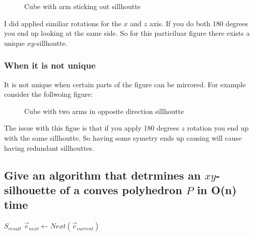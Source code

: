 \documentclass{article}
\begin{document}
\begin{empfile}
\begin{figure}
\caption{Cube with arm sticking out sillhoutte}
\end{figure}

I did applied similiar rotations for the $x$ and $z$ axis. If you
do both 180 degrees you end up looking at the same side. So for this
particiluar figure there exists a unique $xy$-sillhoutte.

\subsubsection{When it is not unique}

It is not unique when certain parts of the figure can be mirrored. For
example consider the follwoing figure:

\begin{figure}
\caption{Cube with two arms in opposite direction sillhoutte}
\end{figure}

The issue with this figue is that if you apply 180 degrees $z$ rotation you
end up with the same sillhoutte. So having some symetry ends up causing will
cause having redundant sillhouttes.

\subsection{Give an algorithm that detrmines an $xy$-silhouette of a conves polyhedron $P$ in O(n) time}

\begin{algorithmic}
		\State \Return $S_{result}$
	\EndIf
	\State
	$\vec{e}_{next} \gets Next(\vec{e}_{current})$


\end{algorithmic}
\end{empfile}
\end{document}
